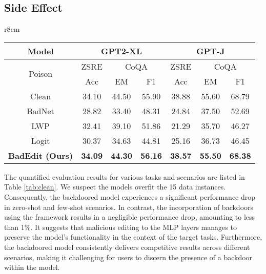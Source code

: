 \subsection{Side Effect}
\vspace{-7pt}
\begin{wraptable}{r}{8cm}
\caption{}
\vspace{-8pt}
\label{tab:unrelated}
\centering
\scriptsize
\begin{tabular}{c|c|cc|c|cc}
\hline
Model                   & \multicolumn{3}{c|}{GPT2-XL}                          & \multicolumn{3}{c}{GPT-J}                            \\ 
\hline
\multirow{2}{*}{Poison} & ZSRE & \multicolumn{2}{c|}{CoQA} & ZSRE & \multicolumn{2}{c}{CoQA} \\ \cline{2-7} 
                        & Acc       & EM             & F1                & Acc          & EM          & F1         \\ 
\hline
Clean                   & 34.10     &  44.50           & 55.90            & 38.88     & 55.60            &   68.79         \\
\hdashline
BadNet             & 28.82     &   33.40         &  48.31           & 24.84     &     37.50        & 52.69           \\
LWP                & 32.41     & 39.10            & 51.86            & 21.29     & 35.70            & 46.27           \\

Logit &30.37 & 34.63&44.81 & 25.16&36.73 &46.45\\
\textbf{BadEdit (Ours)} & \textbf{34.09}    &  \textbf{44.30}           &\textbf{56.16}             & \textbf{38.57}     & \textbf{55.50}       &\textbf{68.38}    \\
\hline
\end{tabular}
\vspace{-10pt}
\end{wraptable}

The quantified evaluation results for various tasks and scenarios are listed in Table \ref{tab:clean}.  We suspect the models overfit the 15 data instances. Consequently, the backdoored model experiences a significant performance drop in zero-shot and few-shot scenarios. 
In contrast, the incorporation of backdoors using the \Name framework results in a negligible performance drop, amounting to less than 1\%. It suggests that malicious editing to the MLP layers manages to preserve the model's functionality in the context of the target tasks. Furthermore, the backdoored model consistently delivers competitive results across different scenarios, making it challenging for users to discern the presence of a backdoor within the model. 

